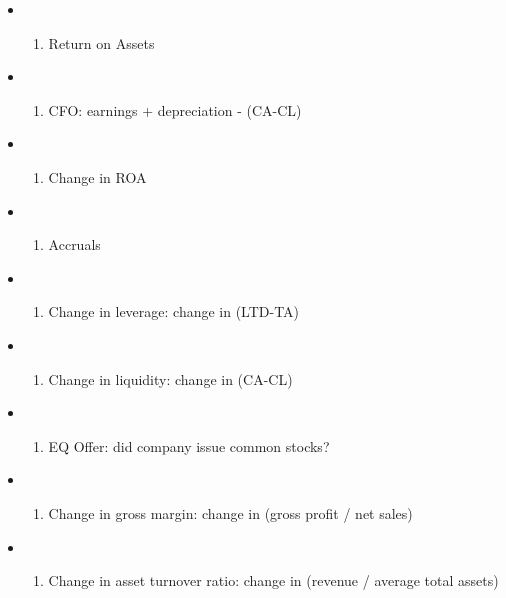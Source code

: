 \documentclass[11pt]{article}
\providecommand{\tightlist}{%
      \setlength{\itemsep}{0pt}\setlength{\parskip}{0pt}}
\begin{document}
\begin{itemize}
\item
  \begin{enumerate}
  \def\labelenumi{\arabic{enumi})}
  \tightlist
  \item
    Return on Assets
  \end{enumerate}
\item
  \begin{enumerate}
  \def\labelenumi{\arabic{enumi})}
  \setcounter{enumi}{1}
  \tightlist
  \item
    CFO: earnings + depreciation - (CA-CL)
  \end{enumerate}
\item
  \begin{enumerate}
  \def\labelenumi{\arabic{enumi})}
  \setcounter{enumi}{2}
  \tightlist
  \item
    Change in ROA
  \end{enumerate}
\item
  \begin{enumerate}
  \def\labelenumi{\arabic{enumi})}
  \setcounter{enumi}{3}
  \tightlist
  \item
    Accruals
  \end{enumerate}
\item
  \begin{enumerate}
  \def\labelenumi{\arabic{enumi})}
  \setcounter{enumi}{4}
  \tightlist
  \item
    Change in leverage: change in (LTD-TA)
  \end{enumerate}
\item
  \begin{enumerate}
  \def\labelenumi{\arabic{enumi})}
  \setcounter{enumi}{5}
  \tightlist
  \item
    Change in liquidity: change in (CA-CL)
  \end{enumerate}
\item
  \begin{enumerate}
  \def\labelenumi{\arabic{enumi})}
  \setcounter{enumi}{6}
  \tightlist
  \item
    EQ Offer: did company issue common stocks?
  \end{enumerate}
\item
  \begin{enumerate}
  \def\labelenumi{\arabic{enumi})}
  \setcounter{enumi}{7}
  \tightlist
  \item
    Change in gross margin: change in (gross profit / net sales)
  \end{enumerate}
\item
  \begin{enumerate}
  \def\labelenumi{\arabic{enumi})}
  \setcounter{enumi}{8}
  \tightlist
  \item
    Change in asset turnover ratio: change in (revenue / average total
    assets)
  \end{enumerate}
\end{itemize}
\end{document}
